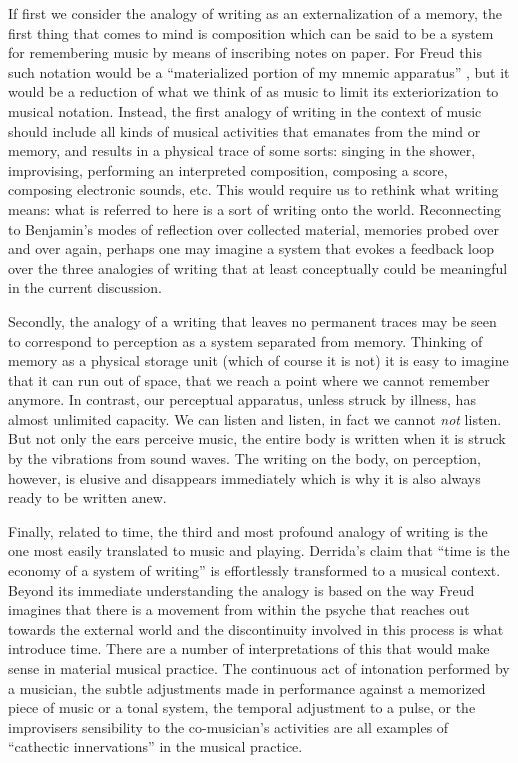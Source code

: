 \documentclass[11pt,a4paper]{article}
\begin{document}
If first we consider the analogy of writing as an externalization of a memory, the first thing that comes to mind is composition which can be said to be a system for remembering music by means of inscribing notes on paper. For Freud this such notation would be a ``materialized portion of my mnemic apparatus'' \citep[p. 207]{freud1997}, but it would be a reduction of what we think of as music to limit its exteriorization to musical notation. Instead, the first analogy of writing in the context of music should include all kinds of musical activities that emanates from the mind or memory, and results in a physical trace of some sorts: singing in the shower, improvising, performing an interpreted composition, composing a score, composing electronic sounds, etc. This would require us to rethink what writing means: what is referred to here is a sort of writing onto the world.
Reconnecting to Benjamin's modes of reflection over collected material, memories probed over and over again, perhaps one may imagine a system that evokes a feedback loop over the three analogies of writing that at least conceptually could be meaningful in the current discussion.

Secondly, the analogy of a writing that leaves no permanent traces may be seen to correspond to perception as a system separated from memory. Thinking of memory as a physical storage unit (which of course it is not) it is easy to imagine that it can run out of space, that we reach a point where we cannot remember anymore. In contrast, our perceptual apparatus, unless struck by illness, has almost unlimited capacity. We can listen and listen, in fact we cannot \emph{not} listen. But not only the ears perceive music, the entire body is written when it is struck by the vibrations from sound waves. The writing on the body, on perception, however, is elusive and disappears immediately which is why it is also always ready to be written anew.

Finally, related to time, the third and most profound analogy of writing is the one most easily translated to music and playing. Derrida's claim that ``time is the economy of a system of writing'' \citep[p. 284]{der78} is effortlessly transformed to a musical context. Beyond its immediate understanding the analogy is based on the way Freud imagines that there is a movement from within the psyche that reaches out towards the external world and the discontinuity involved in this process is what introduce time. There are a number of interpretations of this that would make sense in material musical practice. The continuous act of intonation performed by a musician, the subtle adjustments made in performance against a memorized piece of music or a tonal system, the temporal adjustment to a pulse, or the improvisers sensibility to the co-musician's activities are all examples of ``cathectic innervations'' in the musical practice.
\end{document}
